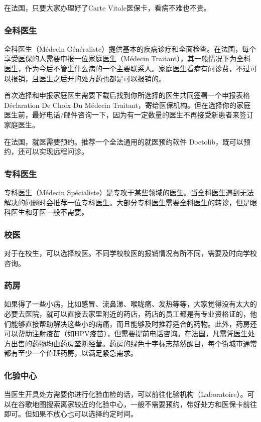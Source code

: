 在法国，只要大家办理好了Carte Vitale医保卡，看病不难也不贵。

\subsubsection{全科医生}	
全科医生（Médecin Généraliste）提供基本的疾病诊疗和全面检查。在法国，每个享受医保的人需要申报一位家庭医生（Médecin Traitant），其一般情况下为全科医生，作为今后不管生什么病的一个主要联系人。家庭医生看病有问诊费，不过可以报销，且医生之后开的处方药也都是可以报销的。

首次选择和申报家庭医生需要下载后找到你所选择的医生共同签署一个申报表格Déclaration De Choix Du Médecin Traitant，寄给医保机构。但在选择你的家庭医生前，最好电话/邮件咨询一下，因为有一定数量的医生不再接受新患者来签订家庭医生。

在法国，就医需要预约。推荐一个全法通用的就医预约软件 Doctolib，既可以预约，还可以实现远程问诊。

\subsubsection{专科医生}
专科医生（Médecin Spécialiste）是专攻于某些领域的医生。当全科医生遇到无法解决的问题时会推荐一位专科医生。大部分专科医生需要全科医生的转诊，但是眼科医生和牙医一般不需要。

\subsubsection{校医}
对于在校生，可以选择校医。不同学校校医的报销情况有所不同，需要及时向学校咨询。

\subsubsection{药房}
如果得了一些小病，比如感冒、流鼻涕、喉咙痛、发热等等，大家觉得没有太大的必要去医院，就可以直接去家里附近的药店，药店的员工都是有专业资格证的，他们能够直接帮助解决这些小的病痛，而且能够及时推荐适合的药物。此外，药房还可以帮助注射疫苗（如HPV疫苗），但需要提前电话咨询。在法国，凡需凭医生处方出售的药物均由药房垄断经营。药房的绿色十字标志赫然醒目，每个街城市通常都有至少一个值班药房，以满足紧急需求。

\subsubsection{化验中心}
当医生开具处方需要你进行化验血检的话，可以前往化验机构（Laboratoire）。可以在谷歌地图搜索离家较近的化验中心，一般不需要预约，带好处方和医保卡前往即可。但如果不放心也可以选择约定时间。

